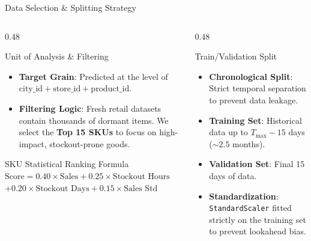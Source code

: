 \documentclass[10pt, aspectratio=169]{beamer}
\begin{document}
\begin{frame}{Data Selection \& Splitting Strategy}
  \begin{columns}[T]
    \begin{column}{0.48\textwidth}
      \begin{block}{Unit of Analysis \& Filtering}
        \begin{itemize}
          \item \textbf{Target Grain}: Predicted at the level of $\text{city\_id} + \text{store\_id} + \text{product\_id}$.
          \item \textbf{Filtering Logic}: Fresh retail datasets contain thousands of dormant items. We select the \textbf{Top 15 SKUs} to focus on high-impact, stockout-prone goods.
        \end{itemize}
      \end{block}
      
      \begin{block}{SKU Statistical Ranking Formula}
        \small
        $\text{Score} = 0.40 \times \text{Sales} + 0.25 \times \text{Stockout Hours}$\\
        $+ 0.20 \times \text{Stockout Days} + 0.15 \times \text{Sales Std}$
      \end{block}
    \end{column}
    
    \begin{column}{0.48\textwidth}
      \begin{exampleblock}{Train/Validation Split}
        \begin{itemize}
          \item \textbf{Chronological Split}: Strict temporal separation to prevent data leakage.
          \item \textbf{Training Set}: Historical data up to $T_{\max} - 15$ days ($\sim 2.5$ months).
          \item \textbf{Validation Set}: Final 15 days of data.
          \item \textbf{Standardization}: \texttt{StandardScaler} fitted strictly on the training set to prevent lookahead bias.
        \end{itemize}
      \end{exampleblock}
    \end{column}
  \end{columns}
\end{frame}
\end{document}

